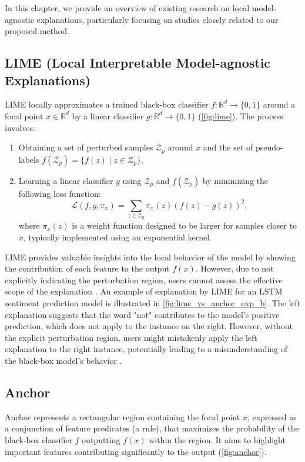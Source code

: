 \documentclass[runningheads]{llncs}
\begin{document}
In this chapter,
we provide an overview of existing research on local model-agnostic explanations,
particularly focusing on studies closely related to our proposed method.

\subsection{LIME (Local Interpretable Model-agnostic Explanations) \cite{ribeiro2016why}}
LIME locally
approximates a trained black-box classifier $f: \mathbb{R}^d \to \{0,1\}$
around a focal point $x \in \mathbb{R}^d$
by a linear classifier $g: \mathbb{R}^d \to \{0,1\}$
(\cref{fig:lime}).
The process involves:
\begin{enumerate}
  \item Obtaining a set of perturbed samples $\mathcal{Z}_p$ around $x$
        and the set of pseudo-labels $f(\mathcal{Z}_p) = \{f(z) \mid z \in \mathcal{Z}_p\}$.
  \item Learning a linear classifier $g$
        using $\mathcal{Z}_p$ and $f(\mathcal{Z}_p)$
        by minimizing the following loss function:
        \begin{equation}
          \label{eq:lime_loss}
          \mathcal{L}(f,g,\pi_x)=\sum_{z\in\mathcal{Z}_p}
          \pi_x(z){\left(f(z)-g(z)\right)}^2,
        \end{equation}
        where $\pi_x(z)$ is a weight function designed to be larger for samples
        closer to $x$, typically implemented using an exponential kernel.
\end{enumerate}

LIME provides valuable insights into the local behavior of the model
by showing the contribution of each feature to the output $f(x)$.
However, due to not explicitly indicating the perturbation region,
users cannot assess the effective scope of the explanation
\cite{ribeiro2018anchors}.
An example of explanation by LIME for an LSTM sentiment prediction model
is illustrated in \cref{fig:lime_vs_anchor_exp_b}.
The left explanation suggests that
the word "not" contributes to the model's positive prediction,
which does not apply to the instance on the right.
However, without the explicit perturbation region,
users might mistakenly apply the left explanation to the right instance,
potentially leading to a misunderstanding of the black-box model's behavior
\cite{ribeiro2018anchors}.

\subsection{Anchor \cite{ribeiro2018anchors}}\label{sec:anchor}
Anchor represents a rectangular region containing the focal point $x$,
expressed as a conjunction of feature predicates (a rule),
that maximizes the probability of the black-box classifier $f$
outputting $f(x)$ within the region.
It aims to highlight important features
contributing significantly to the output (\cref{fig:anchor}).
\end{document}
